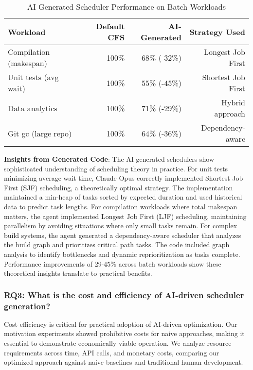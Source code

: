 \begin{table}[h]
\caption{AI-Generated Scheduler Performance on Batch Workloads}
\label{tab:batch-results}
\begin{tabular}{lrrr}
\toprule
Workload & Default CFS & AI-Generated & Strategy Used \\
\midrule
Compilation (makespan) & 100\% & 68\% (-32\%) & Longest Job First \\
Unit tests (avg wait) & 100\% & 55\% (-45\%) & Shortest Job First \\
Data analytics & 100\% & 71\% (-29\%) & Hybrid approach \\
Git gc (large repo) & 100\% & 64\% (-36\%) & Dependency-aware \\
\bottomrule
\end{tabular}
\end{table}

\textbf{Insights from Generated Code}: The AI-generated schedulers show sophisticated understanding of scheduling theory in practice. For unit tests minimizing average wait time, Claude Opus correctly implemented Shortest Job First (SJF) scheduling, a theoretically optimal strategy. The implementation maintained a min-heap of tasks sorted by expected duration and used historical data to predict task lengths. For compilation workloads where total makespan matters, the agent implemented Longest Job First (LJF) scheduling, maintaining parallelism by avoiding situations where only small tasks remain. For complex build systems, the agent generated a dependency-aware scheduler that analyzes the build graph and prioritizes critical path tasks. The code included graph analysis to identify bottlenecks and dynamic reprioritization as tasks complete. Performance improvements of 29-45\% across batch workloads show these theoretical insights translate to practical benefits.

\subsubsection{RQ3: What is the cost and efficiency of AI-driven scheduler generation?}

Cost efficiency is critical for practical adoption of AI-driven optimization. Our motivation experiments showed prohibitive costs for naive approaches, making it essential to demonstrate economically viable operation. We analyze resource requirements across time, API calls, and monetary costs, comparing our optimized approach against naive baselines and traditional human development.

